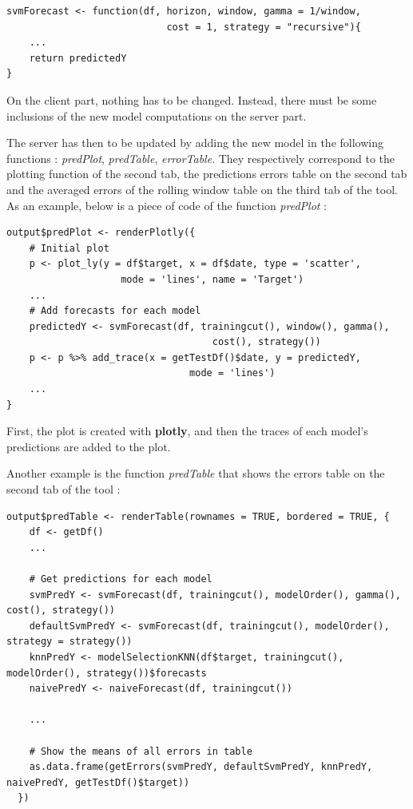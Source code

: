 \documentclass[11pt,a4paper,oneside]{book}
\begin{document}
\begin{lstlisting}
svmForecast <- function(df, horizon, window, gamma = 1/window, 
                            cost = 1, strategy = "recursive"){
    ...
    return predictedY
}
\end{lstlisting}


On the client part, nothing has to be changed. Instead, there must be some inclusions of the new model computations on the server part.

The server has then to be updated by adding the new model in the following functions : \textit{predPlot}, \textit{predTable}, \textit{errorTable}. They respectively correspond to the plotting function of the second tab, the predictions errors table on the second tab and the averaged errors of the rolling window table on the third tab of the tool. As an example, below is a piece of code of the function \textit{predPlot} : \\

\begin{lstlisting}
output$predPlot <- renderPlotly({
    # Initial plot
    p <- plot_ly(y = df$target, x = df$date, type = 'scatter',
                    mode = 'lines', name = 'Target')
    ...
    # Add forecasts for each model
    predictedY <- svmForecast(df, trainingcut(), window(), gamma(), 
                                    cost(), strategy())
    p <- p %>% add_trace(x = getTestDf()$date, y = predictedY, 
                                mode = 'lines')
    ...
}
\end{lstlisting}

First, the plot is created with \textbf{plotly}, and then the traces of each model's predictions are added to the plot. 

Another example is the function \textit{predTable} that shows the errors table on the second tab of the tool : \\

\begin{lstlisting}
output$predTable <- renderTable(rownames = TRUE, bordered = TRUE, {
    df <- getDf()
    ...
    
    # Get predictions for each model
    svmPredY <- svmForecast(df, trainingcut(), modelOrder(), gamma(), cost(), strategy())
    defaultSvmPredY <- svmForecast(df, trainingcut(), modelOrder(), strategy = strategy())
    knnPredY <- modelSelectionKNN(df$target, trainingcut(), modelOrder(), strategy())$forecasts
    naivePredY <- naiveForecast(df, trainingcut())

    ...
    
    # Show the means of all errors in table
    as.data.frame(getErrors(svmPredY, defaultSvmPredY, knnPredY, naivePredY, getTestDf()$target))
  })
\end{lstlisting}  
  
\end{document}
